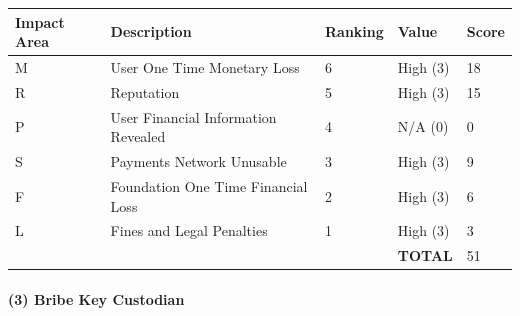 \documentclass[12pt]{article} %
\begin{document}
{\begin{center}
\begin{tabular}{ | l | l | l | l | l |}
  \hline
  \textbf{Impact Area} & \textbf{Description} & \textbf{Ranking} & \textbf{Value} & \textbf{Score}
  \\ \hline
  M & User One Time Monetary Loss			& 6	& High (3)		& 18
  \\ \hline
  R & Reputation		& 5	& High (3)		& 15
  \\ \hline
  P & User Financial Information Revealed		& 4	& N/A (0)		& 0
  \\ \hline
  S & Payments Network Unusable					& 3	& High (3)		& 9
  \\ \hline
  F & Foundation One Time Financial Loss	& 2	& High (3)		& 6
  \\ \hline
  L & Fines and Legal Penalties						& 1	& High (3)		& 3
  \\ \hline
  & & & \textbf{TOTAL} & 51
  \\ \hline
\end{tabular}
\end{center}
\label{tab:severityTamperKeyGeneration}

\paragraph{(3) Bribe Key Custodian }

}
\end{document}
